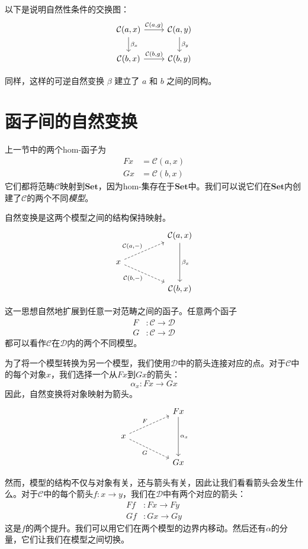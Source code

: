 \documentclass[DaoFP]{subfiles}
\begin{document}
以下是说明自然性条件的交换图：
\[
 \begin{tikzcd}
 \mathcal{C}(a, x)
 \arrow[d, "\beta_x"]
 \arrow[r, "{\mathcal{C}(a, g)}"]
 &
 \mathcal{C}(a, y)
  \arrow[d, "\beta_y"]
 \\
 \mathcal{C}(b, x)
 \arrow[r, "{\mathcal{C}(b, g)}"]
& \mathcal{C}(b, y)
 \end{tikzcd}
\]

同样，这样的可逆自然变换 $\beta$ 建立了 $a$ 和 $b$ 之间的同构。

\section{函子间的自然变换}

上一节中的两个hom-函子为
\begin{align*}
 F x &=   \mathcal{C}(a, x) \\
G x &=   \mathcal{C}(b, x)
\end{align*}
它们都将范畴$\mathcal{C}$映射到$\mathbf{Set}$，因为hom-集存在于$\mathbf{Set}$中。我们可以说它们在$\mathbf{Set}$内创建了$\mathcal{C}$的两个不同\emph{模型}。

自然变换是这两个模型之间的结构保持映射。
\[
 \begin{tikzcd}
 && \cat C(a, x)
 \arrow[dd, "\beta_x"]
 \\
 x
 \arrow[rru, dashed, "{\cat C(a, -)}"]
 \arrow[rrd, dashed, "{\cat C(b, -)}"']
 \\
 && \cat C(b, x)
 \end{tikzcd}
\]

这一思想自然地扩展到任意一对范畴之间的函子。任意两个函子
\begin{align*}
F &\colon \mathcal{C} \to \mathcal{D} \\
G &\colon \mathcal{C} \to \mathcal{D}
\end{align*}
都可以看作$\mathcal{C}$在$\mathcal{D}$内的两个不同模型。

为了将一个模型转换为另一个模型，我们使用$\mathcal{D}$中的箭头连接对应的点。对于$\mathcal{C}$中的每个对象$x$，我们选择一个从$F x$到$G x$的箭头：
\[ \alpha_x \colon F x \to G x \]
因此，自然变换将对象映射为箭头。
\[
 \begin{tikzcd}
 && F x
 \arrow[dd, "\alpha_x"]
 \\
 x
 \arrow[rru, dashed, "F"]
 \arrow[rrd, dashed, "G"']
 \\
 && G x
 \end{tikzcd}
\]

然而，模型的结构不仅与对象有关，还与箭头有关，因此让我们看看箭头会发生什么。对于$\mathcal{C}$中的每个箭头$f \colon x \to y$，我们在$\mathcal{D}$中有两个对应的箭头：
\begin{align*}
 F f &\colon F x \to F y \\
G f &\colon G x \to G y 
\end{align*}
这是$f$的两个提升。我们可以用它们在两个模型的边界内移动。然后还有$\alpha$的分量，它们让我们在模型之间切换。
\end{document}
